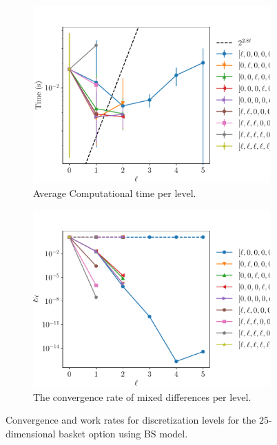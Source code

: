 \documentclass[11pt]{article}
\begin{document}
\begin{figure}[h!]
	\centering
	\begin{subfigure}{.5\textwidth}
		\centering
		\includegraphics[width=0.95\linewidth]{./figures/25D_basket/level_work.pdf}
		\caption{Average Computational time per level.}
		\label{fig:misc_25D_Basket_sub3}
	\end{subfigure}%
	\begin{subfigure}{.5\textwidth}
		\centering
		\includegraphics[width=0.95\linewidth]{./figures/25D_basket/levels_error_rate.pdf}
		\caption{The convergence rate of mixed differences per level.}
		\label{fig:misc_25D_Basket_sub4}
	\end{subfigure}%
	\caption{Convergence and work rates for discretization levels for the $25$-dimensional basket option using BS model.}
	\label{fig:misc_25D_Basket_2}
\end{figure}
\end{document}
